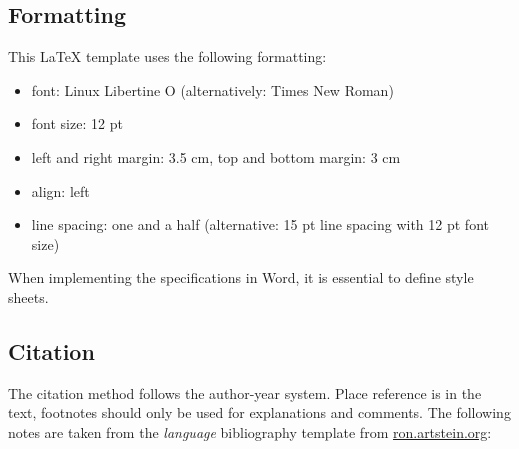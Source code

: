 \documentclass[12pt,letterpaper,ngerman]{article}
\begin{document}
\subsection{Formatting} 
This LaTeX template uses the following formatting:
\begin{itemize}
\setlength{\itemsep}{0pt}
	\item font: Linux Libertine O (alternatively: Times New Roman)
	\item font size: 12 pt
	\item left and right margin: 3.5 cm, top and bottom margin: 3 cm
    \item align: left
	\item line spacing: one and a half (alternative: 15 pt line spacing with 12 pt font size)
\end{itemize}

\noindent
When implementing the specifications in Word, it is essential to define style sheets.

\subsection{Citation} 
\label{sec:cit}

The citation method follows the author-year system. Place reference is in the text, footnotes should only be used for explanations and comments. The following notes are taken from the \emph{language} bibliography template from \url{ron.artstein.org}:\newline
\end{document}
